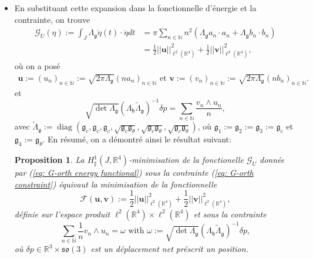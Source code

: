 \documentclass[12pt,a4paper]{article}
\theoremstyle{plain}
\theoremstyle{plain}
\theoremstyle{plain}
\theoremstyle{definition}
\theoremstyle{definition}
\theoremstyle{definition}
\theoremstyle{plain}
\newtheorem{proposition}{Proposition}[section]
\newcommand{\N}{\mathbb{N}}
\newcommand{\R}{\mathbb{R}}
\newcommand{\so}{\mathfrak{so}}
\DeclareMathOperator{\diag}{diag}
\begin{document}
\begin{itemize}
\item En substituant cette expansion dans la fonctionnelle d'énergie et la contrainte, on trouve
\begin{align}
\mathcal{G}_{U} (\eta) := \int_{J} \Lambda_{\mathfrak{g}} \dot{\eta}(t) \cdot \dot{\eta} dt &= \pi \sum_{n  \in \N} n^2(\Lambda_{\mathfrak{g}} a_n \cdot a_n + \Lambda_{\mathfrak{g}} b_n \cdot b_n)  \\  &=
\frac{1}{2} ||\mathbf{u}||_{\ell^2(\R^4)}^2 + \frac{1}{2} ||\mathbf{v}||_{\ell^2(\R^4)}^2,
\end{align}
où on a posé
\begin{align}
\label{eq:relation Fourier coeffs of eta}
	\mathbf{u} := (u_n)_{n \in \N} := \sqrt{2 \pi \Lambda_{\mathfrak{g}}}(n a_n)_{n \in \N} \text{ et } \mathbf{v} := (v_n)_{n \in \N} := \sqrt{2 \pi \Lambda_{\mathfrak{g}}} (n b_n)_{n \in \N}.
\end{align}
et
\begin{equation}
\sqrt{\det \Lambda_{\mathfrak{g}}} (\Lambda_{\mathfrak{h}} \tilde{\Lambda}_{\mathfrak{g}})^{-1} \delta p = \sum_{n \in \N} \frac{v_n  \wedge u_n}{n},
\end{equation}
avec $\tilde{\Lambda}_{\mathfrak{g}} := \diag(\mathfrak{g}_c, \mathfrak{g}_c, \mathfrak{g}_c, \sqrt{\mathfrak{g}_c \mathfrak{g}_{\theta}}, \sqrt{\mathfrak{g}_c \mathfrak{g}_{\theta}}, \sqrt{\mathfrak{g}_c  \mathfrak{g}_{\theta}})$, où $\mathfrak{g}_1 :=\mathfrak{g}_2 := \mathfrak{g}_3 := \mathfrak{g}_c$ et $\mathfrak{g}_4 := \mathfrak{g}_\theta$. En résumé, on a démontré ainsi le résultat suivant:
\begin{proposition}
\label{prop: l2-minimization}
La $H_{\sharp}^1(J, \R^4)$-minimisation de la fonctionelle $\mathcal{G}_U$ donnée par (\ref{eq: G-orth energy functional}) sous la contrainte (\ref{eq: G-orth constraint}) équivaut la minimisation de la fonctionnelle
\begin{equation}
\label{eq:l2-energy}
	\mathcal{F}(\mathbf{u}, \mathbf{v}) := \frac{1}{2} ||\mathbf{u} ||^2_{\ell^2(\R^4)} + \frac{1}{2} ||\mathbf{v}||^2_{\ell^2(\R^4)},
\end{equation}
définie sur l'espace produit $\ell^2(\R^4) \times \ell^2(\R^4)$ et sous la contrainte
\begin{equation}
\label{eq:l2-constraint}
\sum_{n \in \N} \frac{1}{n} v_n \wedge u_n = \omega \text{ with } \omega := \sqrt{\det \Lambda_{\mathfrak{g}}}(\Lambda_{\mathfrak{h}} \tilde{\Lambda}_{\mathfrak{g}})^{-1} \delta p,
\end{equation}
où $\delta p \in \R^3 \times \so(3)$ est un déplacement net préscrit un position.
\end{proposition}


\end{itemize}
\end{document}
